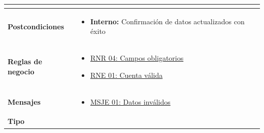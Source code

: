 \begin{center}
\begin{longtable}{| p{3.5cm} | p{11.5cm} |}
\begin{itemize}
              \end{itemize} \\
        \hline  
          \textbf{Postcondiciones} &  
                \begin{itemize}
                \item \textbf{Interno:} Confirmación de datos actualizados con éxito
              \end{itemize} \\
        \hline
          \textbf{Reglas de negocio} & 
              \begin{itemize}
                  \item {\hyperref[rnr_04]{RNR 04: Campos obligatorios}}
                 \item {\hyperref[rnr_01]{RNE 01: Cuenta válida}}
              \end{itemize} \\
        \hline
          \textbf{Mensajes} & 
              \begin{itemize}
                 \item {\hyperref[msje_01]{MSJE 01: Datos inválidos}}
              \end{itemize} \\
        \hline
          \textbf{Tipo} & \\
        \hline      
  \end{longtable}
\end{center}
\endgroup

